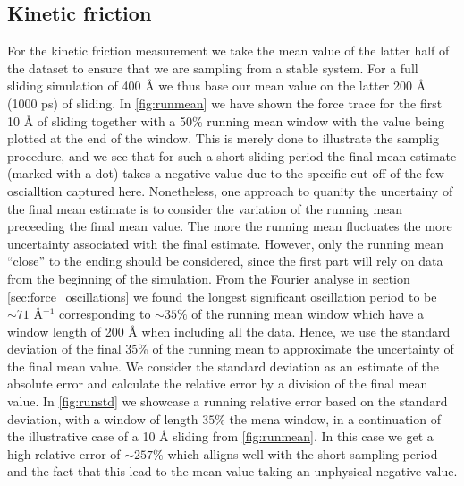 \subsection{Kinetic friction} 
For the kinetic friction measurement we take the mean value of the latter half
of the dataset to ensure that we are sampling from a stable system. For a full
sliding simulation of 400 Å we thus base our mean value on the latter 200 Å (1000 ps) of
sliding. In \cref{fig:runmean} we have shown the force trace for the
first 10 Å of sliding together with a 50\% running mean window with the value being plotted at the end of the window. This is merely done to illustrate the
samplig procedure, and we see that for such a short sliding period the final mean estimate (marked with a dot) takes a negative value due to the specific cut-off of the few oscialltion captured here. Nonetheless, one approach to quanity the
uncertainy of the final mean estimate is to consider the variation of the
running mean preceeding the final mean value. The more the running mean
fluctuates the more uncertainty associated with the final estimate. However, only the
running mean ``close'' to the ending should be considered, since the first part
will rely on data from the beginning of the simulation. From the Fourier analyse
in section \cref{sec:force_oscillations} we found the longest significant
oscillation period to be $\sim 71$ Å$^{-1}$ corresponding to $\sim 35 \%$ of the
running mean window which have a window length of 200 Å when including all the data. Hence, we use the standard deviation of the final 35\% of the running mean to approximate the
uncertainty of the final mean value. We consider the standard deviation as an estimate of the absolute error and calculate the relative error by a division of the final mean value. In \cref{fig:runstd} we showcase a running relative error based on the standard deviation, with a window of length $35 \%$ the mena window, in a continuation of the illustrative case of a 10 Å sliding from \cref{fig:runmean}. In this case we get a high relative error of $\sim 257\%$ which alligns well with the short sampling period and the fact that this lead to the mean value taking an unphysical negative value. 

